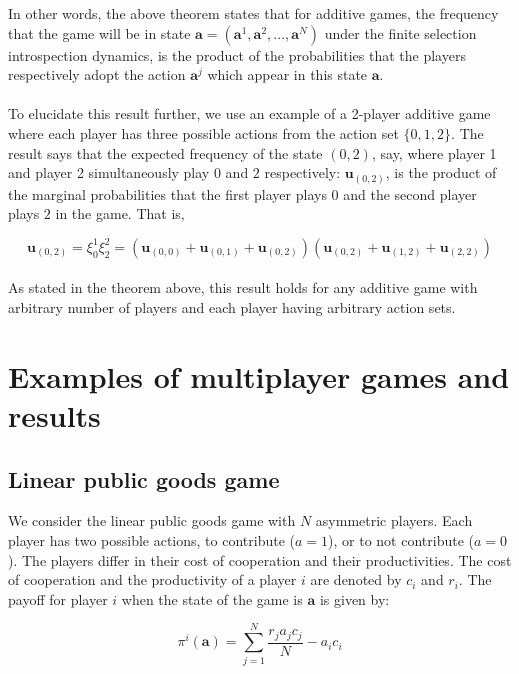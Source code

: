 \documentclass[11pt]{article}
\theoremstyle{plainCl1}
\theoremstyle{plainCl2}
\newcommand{\abf}{\mathbf{a}}
\newcommand{\ubf}{\mathbf{u}}
\begin{document}
\noindent In other words, the above theorem states that for additive games, the frequency that the game will be in state $\abf = (\abf^1, \abf^2, ...,\abf^N)$ under the finite selection introspection dynamics, is the product of the probabilities that the players respectively adopt the action $\abf^j$ which appear in this state $\abf$. \\ \\
\noindent To elucidate this result further, we use an example of a 2-player additive game where each player has three possible actions from the action set $\{\mathit{0},\mathit{1},\mathit{2}\}$. The result says that the expected frequency of the state $(\mathit{0,2})$, say, where player 1 and player 2 simultaneously play $\mathit{0}$ and $\mathit{2}$ respectively: $\ubf_{(\mathit{0,2})}$, is the product of the marginal probabilities that the first player plays $\mathit{0}$ and the second player plays $\mathit{2}$ in the game. That is, 

\begin{equation}
\ubf_{(\mathit{0,2})} = \xi^1_{\mathit{0}}  \xi^2_{\mathit{2}} = (\ubf_{(\mathit{0,0})} + \ubf_{(\mathit{0,1})} + \ubf_{(\mathit{0,2})})(\ubf_{(\mathit{0,2})} + \ubf_{(\mathit{1,2})} + \ubf_{(\mathit{2,2})}) 
\label{Eq:additive-stationary-dist-example}
\end{equation}
\\
\noindent As stated in the theorem above, this result holds for any additive game with arbitrary number of players and each player having arbitrary action sets.

\section*{Examples of multiplayer games and results} 
\subsection*{Linear public goods game}
We consider the linear public goods game with $N$ asymmetric players. Each player has two possible actions, to contribute ($a=1$), or to not contribute ($a=0$). The players differ in their cost of cooperation and their productivities. The cost of cooperation and the productivity of a player $i$ are denoted by $c_i$ and $r_i$.  The payoff for player $i$ when the state of the game is $\abf$ is given by: 

\begin{equation}
\pi^i(\abf) = \sum_{j=1}^N \frac{\displaystyle r_j a_j c_j}{N} - a_i c_i
\label{Eq:linear-pgg-payoff}
\end{equation}
\end{document}
